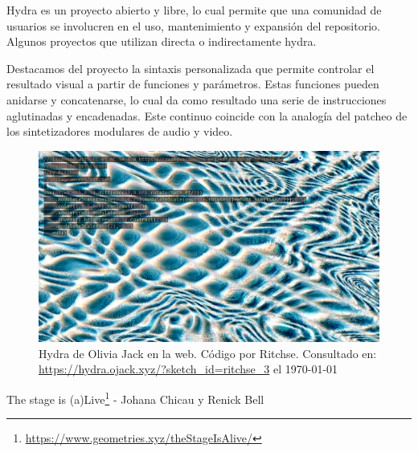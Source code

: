 Hydra es un proyecto abierto y libre, lo cual permite que una comunidad de usuarios se involucren en el uso, mantenimiento y expansión del repositorio. Algunos proyectos que utilizan directa o indirectamente hydra.

Destacamos del proyecto la sintaxis personalizada que permite controlar el resultado visual a partir de funciones y parámetros. Estas funciones pueden anidarse y concatenarse, lo cual da como resultado una serie de instrucciones aglutinadas y encadenadas. Este continuo coincide con la analogía del patcheo de los sintetizadores modulares de audio y video. 


\begin{figure}
\includegraphics[width=\columnwidth]{../img/hydraRit.png} 
\caption[Hydra en la web - Olivia Jack y Ritchse]{Hydra de Olivia Jack en la web. Código por Ritchse. Consultado en: \url{https://hydra.ojack.xyz/?sketch_id=ritchse_3} el \today} %
\label{fig:gallery} 
\end{figure}
  

The stage is (a)Live\footnote{\url{https://www.geometries.xyz/theStageIsAlive/}} - Johana Chicau y Renick Bell


